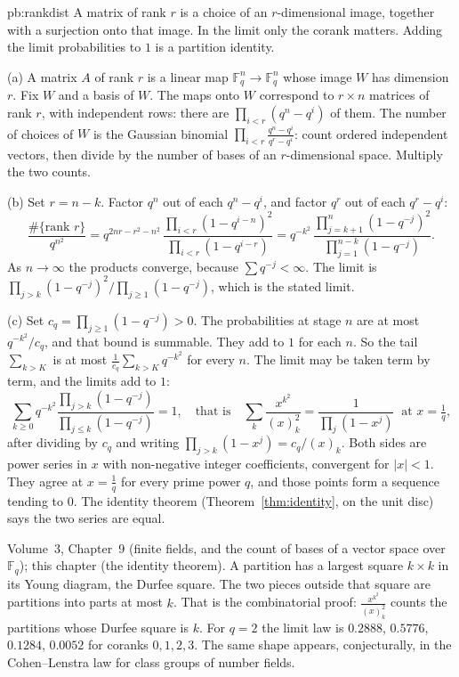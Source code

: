 \begin{solution}{pb:rankdist}
\idea A matrix of rank $r$ is a choice of an $r$-dimensional image, together with a surjection onto that image. In the limit only the corank matters. Adding the limit probabilities to $1$ is a partition identity.

\writeup (a) A matrix $A$ of rank $r$ is a linear map $\mathbb F_q^n\to\mathbb F_q^n$ whose image $W$ has dimension $r$. Fix $W$ and a basis of $W$. The maps onto $W$ correspond to $r\times n$ matrices of rank $r$, with independent rows: there are $\prod_{i<r}(q^n-q^i)$ of them. The number of choices of $W$ is the Gaussian binomial $\prod_{i<r}\frac{q^n-q^i}{q^r-q^i}$: count ordered independent vectors, then divide by the number of bases of an $r$-dimensional space. Multiply the two counts.

(b) Set $r=n-k$. Factor $q^n$ out of each $q^n-q^i$, and factor $q^r$ out of each $q^r-q^i$:
\[
\frac{\#\{\text{rank }r\}}{q^{n^2}}=q^{2nr-r^2-n^2}\,\frac{\prod_{i<r}(1-q^{i-n})^2}{\prod_{i<r}(1-q^{i-r})}
=q^{-k^2}\,\frac{\prod_{j=k+1}^{n}(1-q^{-j})^2}{\prod_{j=1}^{n-k}(1-q^{-j})}.
\]
As $n\to\infty$ the products converge, because $\sum q^{-j}<\infty$. The limit is $\prod_{j>k}(1-q^{-j})^2/\prod_{j\ge1}(1-q^{-j})$, which is the stated limit.

(c) Set $c_q=\prod_{j\ge1}(1-q^{-j})>0$. The probabilities at stage $n$ are at most $q^{-k^2}/c_q$, and that bound is summable. They add to $1$ for each $n$. So the tail $\sum_{k>K}$ is at most $\frac1{c_q}\sum_{k>K}q^{-k^2}$ for every $n$. The limit may be taken term by term, and the limits add to $1$:
\[
\sum_{k\ge0}q^{-k^2}\frac{\prod_{j>k}(1-q^{-j})}{\prod_{j\le k}(1-q^{-j})}=1,\quad\text{that is}\quad
\sum_k\frac{x^{k^2}}{(x)_k^2}=\frac1{\prod_j(1-x^j)}\ \text{ at }x=\tfrac1q,
\]
after dividing by $c_q$ and writing $\prod_{j>k}(1-x^j)=c_q/(x)_k$. Both sides are power series in $x$ with non-negative integer coefficients, convergent for $|x|<1$. They agree at $x=\frac1q$ for every prime power $q$, and those points form a sequence tending to $0$. The identity theorem (Theorem~\ref{thm:identity}, on the unit disc) says the two series are equal.

\tools Volume~3, Chapter~9 (finite fields, and the count of bases of a vector space over $\mathbb F_q$); this chapter (the identity theorem).
\leads A partition has a largest square $k\times k$ in its Young diagram, the Durfee square. The two pieces outside that square are partitions into parts at most $k$. That is the combinatorial proof: $\frac{x^{k^2}}{(x)_k^2}$ counts the partitions whose Durfee square is $k$. For $q=2$ the limit law is $0.2888$, $0.5776$, $0.1284$, $0.0052$ for coranks $0,1,2,3$. The same shape appears, conjecturally, in the Cohen--Lenstra law for class groups of number fields.
\end{solution}

